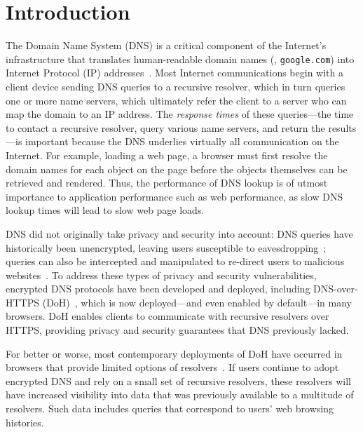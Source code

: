 \section{Introduction}\label{sec:intro}

The Domain Name System (DNS) is a critical component of the Internet's
infrastructure that translates human-readable domain names (\eg,
\texttt{google.com}) into Internet Protocol (IP) addresses~\cite{rfc1035}.
Most Internet communications begin with a client device sending DNS queries to
a recursive resolver, which in turn queries one or more name servers, which
ultimately refer the client to a server who can map the domain to an IP
address.
The \emph{response times} of these queries---the time 
to contact a recursive resolver, query various name servers, and return
the results---is important because the DNS underlies virtually all
communication on the Internet.  For example, loading a
web page, a browser must first resolve the domain names for each object on the
page before the objects themselves can be retrieved and rendered.  Thus, the
performance of DNS lookup is of utmost importance to application performance
such as web performance, as slow DNS lookup times will lead to slow web page
loads.

DNS did not originally take privacy and security into account: DNS queries
have historically been unencrypted, leaving users susceptible to
eavesdropping~\cite{dns-eavesdrop}; queries can also be intercepted and
manipulated to re-direct users to malicious websites~\cite{dns-redirect}.  To
address these types of privacy and security vulnerabilities, encrypted DNS
protocols have been developed and deployed, including DNS-over-HTTPS
(DoH)~\cite{rfc8484}, which is now deployed---and even enabled by default---in
many browsers.  DoH enables clients to communicate with recursive resolvers
over HTTPS, providing privacy and security guarantees that DNS previously
lacked.

For better or worse, most contemporary deployments of DoH have occurred in
browsers that provide limited options of
resolvers~\cite{ffChoices,chromeResolvers}.  If users continue to adopt
encrypted DNS and rely on a small set of recursive resolvers, these resolvers
will have increased visibility into data that was previously available to a
multitude of resolvers.  Such data includes queries that correspond to users'
web browsing histories.

